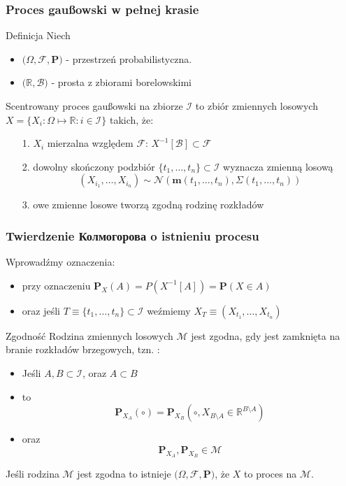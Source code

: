 \documentclass[draft, xetex]{beamer}
\begin{document}
\begin{frame}
	\frametitle{Proces gau\ss owski w pełnej krasie}
	
	\begin{block}{Definicja}
		Niech
		\begin{itemize}
			\item $\Big(\Omega, \mathcal{F}, \mathbf{P}\Big)$ - przestrzeń probabilistyczna.
			\item $\Big(\mathbb{R}, \mathcal{B}\Big)$ - prosta z zbiorami borelowskimi
		\end{itemize}		
	
		Scentrowany proces gau\ss owski na zbiorze $\mathcal{I}$ to zbiór zmiennych losowych $X = \{ X_i : \Omega \mapsto \mathbb{R}: i \in \mathcal{I} \}$ takich, że:
		\begin{itemize}
			\item[1.] $X_i$ mierzalna względem $\mathcal{F}$: $X^{-1} [\mathcal{B}] \subset \mathcal{F}$
			\item[2.] dowolny skończony podzbiór $\{t_1, \dots, t_n \} \subset \mathcal{I}$ wyznacza zmienną losową 
			$$(X_{i_1}, \dots, X_{i_n}) \sim \mathcal{N}(\mathbf{m}(t_1, \dots, t_n), \Sigma(t_1, \dots, t_n))$$
			\item[3.] owe zmienne losowe tworzą zgodną rodzinę rozkładów
		\end{itemize}				

	\end{block}
\end{frame}

\begin{frame}
	\frametitle{Twierdzenie Колмогорова o istnieniu procesu}
	
	Wprowadźmy oznaczenia:	

		\begin{itemize}
			\item przy oznaczeniu $\mathbf{P}_X (A) = P(X^{-1} [A] ) = \mathbf{P}(X \in A) $
			\item oraz jeśli $T \equiv \{ t_1, \dots, t_n\} \subset \mathcal{I}$ weźmiemy $X_T \equiv (X_{t_1}, \dots, X_{t_n})$
		\end{itemize}
		
	\begin{block}{Zgodność}
		Rodzina zmiennych losowych $\mathcal{M}$ jest zgodna, gdy jest zamknięta na branie rozkładów brzegowych, tzn. :
		\begin{itemize}
			\item Jeśli $A, B \subset \mathcal{I}$, oraz $A \subset B$
			\item to $$\mathbf{P}_{X_A}(\circ) = \mathbf{P}_{X_B} (\circ, X_{B\setminus A} \in \mathbb{R}^{B \setminus A})$$
			\item oraz $$\mathbf{P}_{X_A}, \mathbf{P}_{X_B} \in \mathcal{M}$$
		\end{itemize}				
		
		Jeśli rodzina $\mathcal{M}$ jest zgodna to istnieje $\Big(\Omega, \mathcal{F}, \mathbf{P}\Big)$, że $X$ to proces na $\mathcal{M}$. 
	\end{block}
	
\end{frame}
\end{document}
